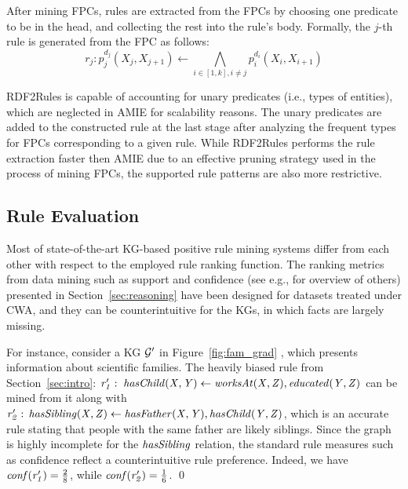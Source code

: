After mining FPCs, rules are extracted from the FPCs by choosing one %
predicate to be in    %
the head, and collecting the rest into the rule's  body. 
Formally, the  $j$-th rule is generated from the FPC as follows:
\[r_j: p_j^{d_j}(X_j,X_{j+1}) \leftarrow \underset{i \in [1,k], i \ne j}{\bigwedge} p_i^{d_i}(X_i,X_{i+1}) \]

RDF2Rules is capable of accounting for unary predicates (i.e., types of entities), which are neglected in AMIE for scalability reasons. %
The unary predicates are added to the constructed rule at the last stage after analyzing the 
frequent types for FPCs corresponding to a given rule.
While RDF2Rules performs the rule extraction faster then AMIE due to an effective pruning strategy
used in the process of mining FPCs, the supported rule patterns are also more restrictive. 

\subsection{Rule Evaluation}
Most of state-of-the-art KG-based positive rule mining systems %
differ from each other with respect to the employed %
rule ranking function. %
The ranking metrics from data mining such as support and confidence (see e.g., \cite{metrics-summary} for overview of others) presented in Section~\ref{sec:reasoning} have been designed for datasets treated under CWA, and they can be counterintuitive for the KGs, in which facts are largely missing. 

\begin{example}\label{ex:rulesforgprime}
For instance, consider a KG $\mathcal{G}'$ in Figure~\ref{fig:fam_grad} \cite{carl}, which presents information about scientific families. 
The heavily biased rule from Section~\ref{sec:intro}: $\mathit{r_1':\;hasChild(X,Y)\leftarrow worksAt(X,Z), educated(Y,Z)}$ can be mined from it along with $\mathit{r_2':\,hasSibling(X,Z)\leftarrow hasFather(X,Y),hasChild(Y,Z)}$, which is an accurate rule stating that people with the same father are likely siblings. Since the graph is highly incomplete for the $\mathit{hasSibling}$ relation, the standard rule measures such as confidence reflect a counterintuitive rule preference. Indeed, we have $\mathit{conf(\mathit{r_1'})}=\frac{2}{8}$, while
$\mathit{conf(\mathit{r_2'})}=\frac{1}{6}$. \qed
\end{example}

